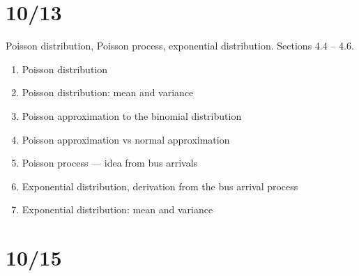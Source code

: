 \documentclass[letterpaper,11pt,oneside,reqno]{amsart}
\numberwithin{equation}{section}
\theoremstyle{definition}
\begin{document}
\section{10/13}

Poisson distribution, Poisson process, exponential distribution.
Sections 4.4 -- 4.6.

\begin{enumerate}
	\item Poisson distribution
	\item Poisson distribution: mean and variance
	\item Poisson approximation to the binomial distribution
	\item Poisson approximation vs normal approximation
	\item Poisson process --- idea from bus arrivals
	\item Exponential distribution, derivation from the bus arrival process
	\item Exponential distribution: mean and variance
\end{enumerate}



\section{10/15}




%
\end{document}
